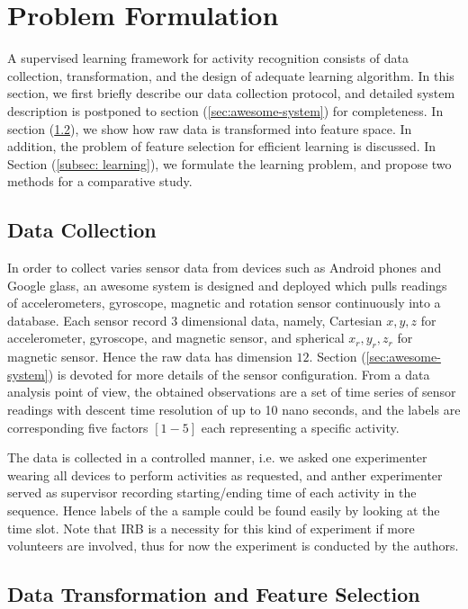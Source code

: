 
\section{Problem Formulation}
\label{sec:problem-formulation}

A supervised learning framework for activity recognition consists of data collection, transformation, and the design of adequate learning algorithm. In this section, we first briefly describe our data collection protocol, and detailed system description is postponed to section (\ref{sec:awesome-system}) for completeness. In section (\ref{subsec: data-transform}), we show how raw data is transformed into feature space. In addition, the problem of feature selection  for efficient learning is discussed. In Section (\ref{subsec: learning}), we formulate the learning problem, and propose two methods for a comparative study.  

\subsection{Data Collection}
\label{subsec: data-collection}
In order to collect varies sensor data from devices such as Android phones and Google glass, an awesome system is designed and deployed which pulls readings of accelerometers, gyroscope, magnetic and rotation sensor continuously into a database. Each sensor record 3 dimensional data, namely, Cartesian $x,y,z$ for accelerometer, gyroscope, and magnetic sensor, and spherical $x_r,y_r,z_r$ for magnetic sensor. Hence the raw data has dimension $12$. Section (\ref{sec:awesome-system}) is devoted for more details of the sensor configuration. From a data analysis point of view, the obtained observations are a set of time series of sensor readings with descent time resolution of up to 10 nano seconds, and the labels are corresponding five factors $[1 - 5]$ each representing a specific activity. 

The data is collected in a controlled manner, i.e. we asked one experimenter wearing all devices to perform activities as requested, and anther experimenter served as supervisor recording starting/ending time of each activity in the sequence. Hence labels of the a sample could be found easily by looking at the time slot. Note that IRB is a necessity for this kind of experiment if more volunteers are involved, thus for now the experiment is conducted by the authors. 

\subsection{Data Transformation and Feature Selection}
\label{subsec: data-transform}

